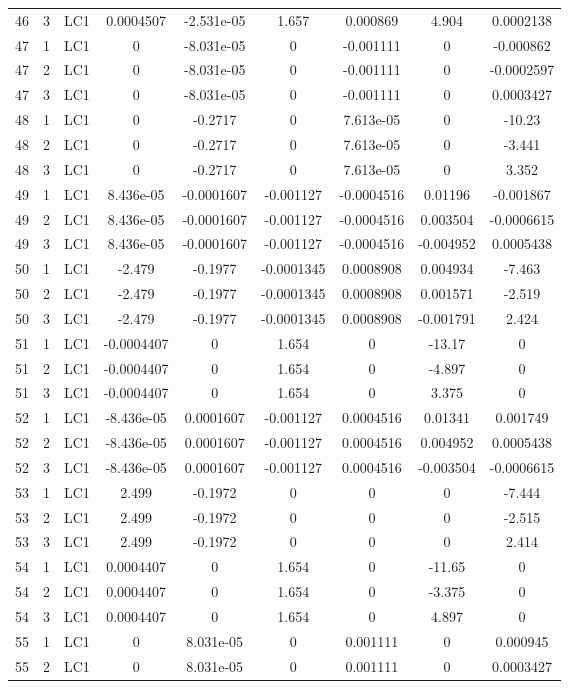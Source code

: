 \documentclass{article}%
\begin{document}
\begin{longtable}{| c c c | c c c c c c |}
46&3&LC1&0.0004507&{-}2.531e{-}05&1.657&0.000869&4.904&0.0002138\\%
47&1&LC1&0&{-}8.031e{-}05&0&{-}0.001111&0&{-}0.000862\\%
47&2&LC1&0&{-}8.031e{-}05&0&{-}0.001111&0&{-}0.0002597\\%
47&3&LC1&0&{-}8.031e{-}05&0&{-}0.001111&0&0.0003427\\%
48&1&LC1&0&{-}0.2717&0&7.613e{-}05&0&{-}10.23\\%
48&2&LC1&0&{-}0.2717&0&7.613e{-}05&0&{-}3.441\\%
48&3&LC1&0&{-}0.2717&0&7.613e{-}05&0&3.352\\%
49&1&LC1&8.436e{-}05&{-}0.0001607&{-}0.001127&{-}0.0004516&0.01196&{-}0.001867\\%
49&2&LC1&8.436e{-}05&{-}0.0001607&{-}0.001127&{-}0.0004516&0.003504&{-}0.0006615\\%
49&3&LC1&8.436e{-}05&{-}0.0001607&{-}0.001127&{-}0.0004516&{-}0.004952&0.0005438\\%
50&1&LC1&{-}2.479&{-}0.1977&{-}0.0001345&0.0008908&0.004934&{-}7.463\\%
50&2&LC1&{-}2.479&{-}0.1977&{-}0.0001345&0.0008908&0.001571&{-}2.519\\%
50&3&LC1&{-}2.479&{-}0.1977&{-}0.0001345&0.0008908&{-}0.001791&2.424\\%
51&1&LC1&{-}0.0004407&0&1.654&0&{-}13.17&0\\%
51&2&LC1&{-}0.0004407&0&1.654&0&{-}4.897&0\\%
51&3&LC1&{-}0.0004407&0&1.654&0&3.375&0\\%
52&1&LC1&{-}8.436e{-}05&0.0001607&{-}0.001127&0.0004516&0.01341&0.001749\\%
52&2&LC1&{-}8.436e{-}05&0.0001607&{-}0.001127&0.0004516&0.004952&0.0005438\\%
52&3&LC1&{-}8.436e{-}05&0.0001607&{-}0.001127&0.0004516&{-}0.003504&{-}0.0006615\\%
53&1&LC1&2.499&{-}0.1972&0&0&0&{-}7.444\\%
53&2&LC1&2.499&{-}0.1972&0&0&0&{-}2.515\\%
53&3&LC1&2.499&{-}0.1972&0&0&0&2.414\\%
54&1&LC1&0.0004407&0&1.654&0&{-}11.65&0\\%
54&2&LC1&0.0004407&0&1.654&0&{-}3.375&0\\%
54&3&LC1&0.0004407&0&1.654&0&4.897&0\\%
55&1&LC1&0&8.031e{-}05&0&0.001111&0&0.000945\\%
55&2&LC1&0&8.031e{-}05&0&0.001111&0&0.0003427\\%

\end{longtable}
\end{document}
